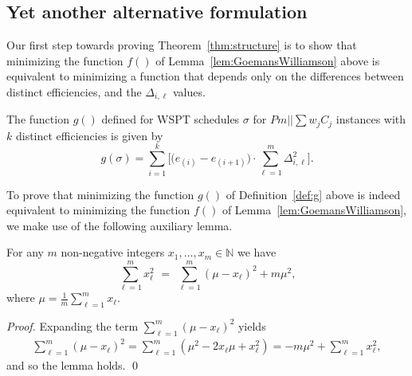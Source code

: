 \documentclass[11pt]{llncs}
\begin{document}

\subsection{Yet another alternative formulation}

Our first step towards proving Theorem~\ref{thm:structure} is to show that minimizing the function $f()$ of Lemma~\ref{lem:GoemansWilliamson} above is equivalent to minimizing a function that depends only on the differences between distinct efficiencies, and the $\Delta_{i,\ell}$ values. 

\begin{definition}
\label{def:g}
The function $g()$ defined for WSPT schedules $\sigma$ for $Pm||\sum w_j C_j$ instances with $k$ distinct efficiencies is given by    
$$
g(\sigma) =   %
\sum_{i = 1}^{k}  \Big[ \big(e_{(i)}-e_{(i+1)}\big)  \cdot \sum^{m}_{\ell=1} \Delta^2_{i,\ell} \Big].
$$
\end{definition}

To prove that minimizing the function $g()$ of Definition~\ref{def:g} above is indeed equivalent to minimizing the function $f()$ of Lemma~\ref{lem:GoemansWilliamson}, we make use of the following auxiliary lemma. 

\begin{lemma} 
\label{lem:Tomohiro}
For any $m$ non-negative integers $x_1,\ldots,x_m \in \mathbb{N}$ we have
$$
\sum_{\ell = 1}^m x_\ell^2 \,\, = \,\, \sum_{\ell =1}^m (\mu - x_\ell)^2 +  m\mu^2,
$$ 
where $\mu = \frac{1}{m} \sum_{\ell=1}^m x_\ell$.
\end{lemma}
\begin{proof}
Expanding the term $\sum_{\ell = 1}^m (\mu - x_\ell)^2$ yields
\begin{align*}
\sum_{\ell = 1}^m (\mu - x_\ell)^2 = \sum_{\ell = 1}^m (\mu^2 - 2x_\ell \mu + x_\ell^2) = -m\mu^2 + \sum_{\ell = 1}^m x_\ell^2,
\end{align*}
and so the lemma holds. \qed
\end{proof}
\end{document}
